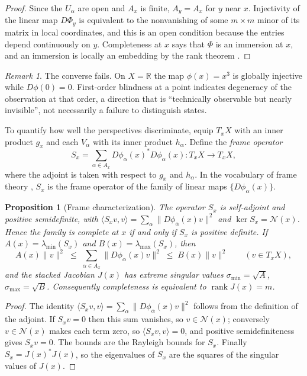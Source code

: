 \documentclass[11pt]{article}
\newtheorem{proposition}{Proposition}
\theoremstyle{remark}
\newtheorem{remark}{Remark}
\newcommand{\R}{\mathbb{R}}
\newcommand{\N}{\mathcal{N}}
\newcommand{\rank}{\operatorname{rank}}
\begin{document}
\begin{proof}
Since the $U_\alpha$ are open and $A_x$ is finite, $A_y=A_x$ for $y$ near $x$. Injectivity of the linear map $D\Phi_y$ is equivalent to the nonvanishing of some $m\times m$ minor of its matrix in local coordinates, and this is an open condition because the entries depend continuously on $y$. Completeness at $x$ says that $\Phi$ is an immersion at $x$, and an immersion is locally an embedding by the rank theorem \cite{lee}.
\end{proof}

\begin{remark}
The converse fails. On $X=\R$ the map $\phi(x)=x^3$ is globally injective while $D\phi(0)=0$. First-order blindness at a point indicates degeneracy of the observation at that order, a direction that is ``technically observable but nearly invisible'', not necessarily a failure to distinguish states.
\end{remark}

To quantify how well the perspectives discriminate, equip $T_xX$ with an inner product $g_x$ and each $V_\alpha$ with its inner product $h_\alpha$. Define the \emph{frame operator}
\[
S_x=\sum_{\alpha\in A_x}D\phi_\alpha(x)^{*}D\phi_\alpha(x):T_xX\to T_xX,
\]
where the adjoint is taken with respect to $g_x$ and $h_\alpha$. In the vocabulary of frame theory \cite{christensen}, $S_x$ is the frame operator of the family of linear maps $\{D\phi_\alpha(x)\}$.

\begin{proposition}[Frame characterization]
The operator $S_x$ is self-adjoint and positive semidefinite, with $\langle S_xv,v\rangle=\sum_{\alpha}\|D\phi_\alpha(x)v\|^2$ and $\ker S_x=\N(x)$. Hence the family is complete at $x$ if and only if $S_x$ is positive definite. If $A(x)=\lambda_{\min}(S_x)$ and $B(x)=\lambda_{\max}(S_x)$, then
\[
A(x)\|v\|^2\;\le\;\sum_{\alpha\in A_x}\|D\phi_\alpha(x)v\|^2\;\le\;B(x)\|v\|^2
\qquad(v\in T_xX),
\]
and the stacked Jacobian $J(x)$ has extreme singular values $\sigma_{\min}=\sqrt{A}$, $\sigma_{\max}=\sqrt{B}$. Consequently completeness is equivalent to $\rank J(x)=m$.
\end{proposition}

\begin{proof}
The identity $\langle S_xv,v\rangle=\sum_\alpha\|D\phi_\alpha(x)v\|^2$ follows from the definition of the adjoint. If $S_xv=0$ then this sum vanishes, so $v\in\N(x)$; conversely $v\in\N(x)$ makes each term zero, so $\langle S_xv,v\rangle=0$, and positive semidefiniteness gives $S_xv=0$. The bounds are the Rayleigh bounds for $S_x$. Finally $S_x=J(x)^{*}J(x)$, so the eigenvalues of $S_x$ are the squares of the singular values of $J(x)$.
\end{proof}
\end{document}

